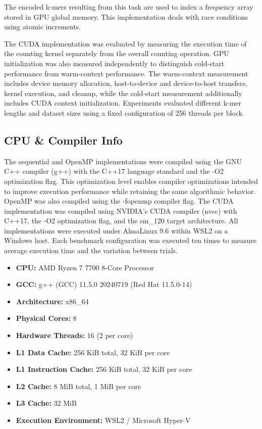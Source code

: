 \documentclass{article}
\begin{document}
The encoded k-mers resulting from this task are used to index a frequency array stored in GPU global memory. This implementation deals with race conditions 
using atomic increments. 

\vspace{\baselineskip}

The CUDA implementation was evaluated by measuring the execution time of the counting kernel separately
from the overall counting operation. GPU initialization was also measured independently to distinguish
cold-start performance from warm-context performance. The warm-context measurement includes device
memory allocation, host-to-device and device-to-host transfers, kernel execution, and cleanup, while
the cold-start measurement additionally includes CUDA context initialization. Experiments evaluated
different k-mer lengths and dataset sizes using a fixed configuration of 256 threads per block.

\vspace{\baselineskip}

\subsection{CPU \& Compiler Info}

The sequential and OpenMP implementations were compiled using the GNU C++ compiler (g++) with the C++17
language standard and the -O2 optimization flag. This optimization level enables compiler
optimizations intended to improve execution performance while retaining the same algorithmic
behavior. OpenMP was also compiled using the -fopenmp compiler flag. The CUDA implementation was compiled using 
NVIDIA's CUDA compiler (nvcc) with C++17, the -O2 optimization flag, and the sm\_120 target architecture. All 
implementations were executed under AlmaLinux 9.6 within WSL2 on a Windows host. Each benchmark configuration 
was executed ten times to measure average execution time and the variation between trials.
\begin{itemize}
    \item \textbf{CPU:} AMD Ryzen 7 7700 8-Core Processor
    \item \textbf{GCC:} g++ (GCC) 11.5.0 20240719 (Red Hat 11.5.0-14)
    \item \textbf{Architecture:} x86\_64
    \item \textbf{Physical Cores:} 8
    \item \textbf{Hardware Threads:} 16 (2 per core)
    \item \textbf{L1 Data Cache:} 256 KiB total, 32 KiB per core
    \item \textbf{L1 Instruction Cache:} 256 KiB total, 32 KiB per core
    \item \textbf{L2 Cache:} 8 MiB total, 1 MiB per core
    \item \textbf{L3 Cache:} 32 MiB
    \item \textbf{Execution Environment:} WSL2 / Microsoft Hyper-V
\end{itemize}
\end{document}
